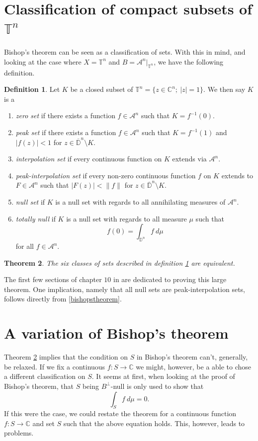 \documentclass[a4paper,12pt,twoside,BCOR=10mm]{scrbook}
\newtheorem{theorem}{Theorem}[section]
\theoremstyle{definition}
\theoremstyle{definition}
\theoremstyle{definition}
\newtheorem{definition}[theorem]{Definition}
\begin{document}
\section{Classification of compact subsets of $\mathbb{T}^n$}
\label{section4}
Bishop's theorem can be seen as a classification of sets.
With this in mind, and looking at the case where $X = \mathbb{T}^n$ and $B = \mathcal{A}^n|_{\mathbb{T}^n}$, we have the following definition.
\begin{definition}
\label{bigdef}
Let $K$ be a closed subset of $\mathbb{T}^n = \{z \in \mathbb{C}^n;\ |z| = 1\}$.
We then say $K$ is a
\begin{enumerate}
	\item \emph{zero set} if there exists a function $f \in \mathcal{A}^n$ such that $K = f^{-1}(0)$.
	\item \emph{peak set} if there exists a function $f \in \mathcal{A}^n$ such that $K = f^{-1}(1)$ and $|f(z)| < 1$ for $z \in \overline{\mathbb{D}}^n \setminus K$.
	\item \emph{interpolation set} if every continuous function on $K$ extends via $\mathcal{A}^n$. 
	\item \emph{peak-interpolation set} if every non-zero continuous function $f$ on $K$ extends to $F \in \mathcal{A}^n$ such that $|F(z)| < \|f\|$ for $z \in \overline{\mathbb{D}}^n \setminus K$.
	\item \emph{null set} if $K$ is a null set with regards to all annihilating measures of $\mathcal{A}^n$.
	\item \emph{totally null} if $K$ is a null set with regards to all measure $\mu$ such that
			\[
				f(0) = \int_{\mathbb{D}^n} f\ d\mu
			\]
			for all $f \in \mathcal{A}^n$.
\end{enumerate}
\end{definition}
\begin{theorem}
	\label{bigtheorem}
	The six classes of sets described in definition \ref{bigdef} are equivalent.
\end{theorem}
The first few sections of chapter $10$ in \citep{rudin3} are dedicated to proving this large theorem.
One implication, namely that all null sets are peak-interpolation sets, follows directly from \ref{bishopstheorem}.

\section{A variation of Bishop's theorem}
\label{section5}
Theorem \ref{bigtheorem} implies that the condition on $S$ in Bishop's theorem can't, generally, be relaxed.
If we fix a continuous $f: S \rightarrow \mathbb{C}$ we might, however, be a able to chose a different classification on $S$.
It seems at first, when looking at the proof of Bishop's theorem, that $S$ being $B^{\bot}$-null is only used to show that
\[
	\int_S f\ d\mu = 0.
\]
If this were the case, we could restate the theorem for a continuous function $f: S \rightarrow \mathbb{C}$ and set $S$ such that the above equation holds.
This, however, leads to problems.
\end{document}
